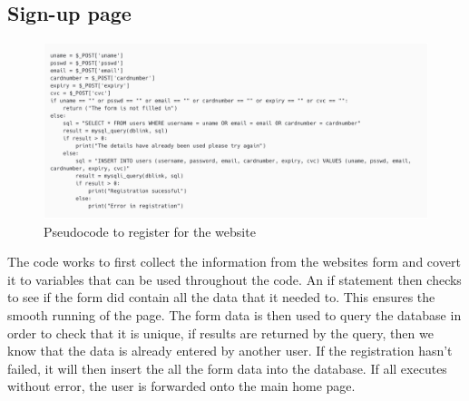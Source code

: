 \subsection{Sign-up page}
\begin{figure}[H]
    \centering
    \includegraphics[scale=0.2]{ch2_design/alg_signup.png}
    \caption{Pseudocode to register for the website}
    \label{fig:alg_signup}
\end{figure}
The code works to first collect the information from the websites form and covert it to variables that can be used throughout the code. An if statement then checks to see if the form did contain all the data that it needed to. This ensures the smooth running of the page. The form data is then used to query the database in order to check that it is unique, if results are returned by the query, then we know that the data is already entered by another user. If the registration hasn’t failed, it will then insert the all the form data into the database. If all executes without error, the user is forwarded onto the main home page.
 
